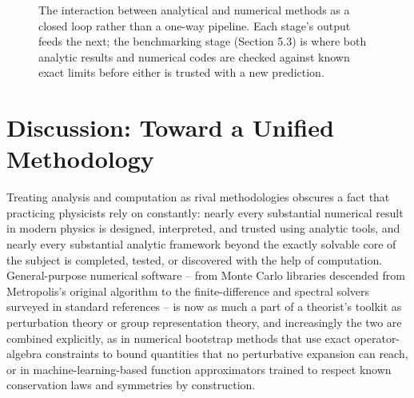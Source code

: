 \documentclass[11pt]{article}
\begin{document}
\begin{figure}[h]
\centering
{}
\caption{The interaction between analytical and numerical methods as a closed loop rather than a one-way pipeline. Each stage's output feeds the next; the benchmarking stage (Section 5.3) is where both analytic results and numerical codes are checked against known exact limits before either is trusted with a new prediction.}
\label{fig:loop}
\end{figure}

\section{Discussion: Toward a Unified Methodology}

Treating analysis and computation as rival methodologies obscures a fact that practicing physicists rely on constantly: nearly every substantial numerical result in modern physics is designed, interpreted, and trusted using analytic tools, and nearly every substantial analytic framework beyond the exactly solvable core of the subject is completed, tested, or discovered with the help of computation. General-purpose numerical software -- from Monte Carlo libraries descended from Metropolis's original algorithm to the finite-difference and spectral solvers surveyed in standard references \cite{PressNumericalRecipes2007} -- is now as much a part of a theorist's toolkit as perturbation theory or group representation theory, and increasingly the two are combined explicitly, as in numerical bootstrap methods that use exact operator-algebra constraints to bound quantities that no perturbative expansion can reach, or in machine-learning-based function approximators trained to respect known conservation laws and symmetries by construction.
\end{document}

